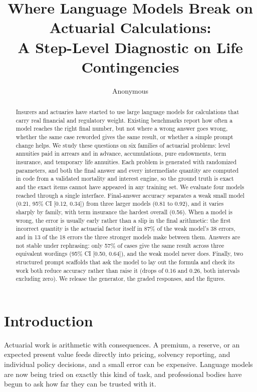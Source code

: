 \documentclass{article}
\title{Where Language Models Break on Actuarial Calculations:\\A Step-Level Diagnostic on Life Contingencies}
\author{Anonymous}
\begin{document}
\raggedbottom
\maketitle

\begin{abstract}
Insurers and actuaries have started to use large language models for calculations that carry real financial and regulatory weight. Existing benchmarks report how often a model reaches the right final number, but not where a wrong answer goes wrong, whether the same case reworded gives the same result, or whether a simple prompt change helps. We study these questions on six families of actuarial problems: level annuities paid in arrears and in advance, accumulations, pure endowments, term insurance, and temporary life annuities. Each problem is generated with randomized parameters, and both the final answer and every intermediate quantity are computed in code from a validated mortality and interest engine, so the ground truth is exact and the exact items cannot have appeared in any training set. We evaluate four models reached through a single interface. Final-answer accuracy separates a weak small model (0.21, 95\% CI [0.12, 0.34]) from three larger models (0.81 to 0.92), and it varies sharply by family, with term insurance the hardest overall (0.56). When a model is wrong, the error is usually early rather than a slip in the final arithmetic: the first incorrect quantity is the actuarial factor itself in 87\% of the weak model's 38 errors, and in 13 of the 18 errors the three stronger models make between them. Answers are not stable under rephrasing: only 57\% of cases give the same result across three equivalent wordings (95\% CI [0.50, 0.64]), and the weak model never does. Finally, two structured prompt scaffolds that ask the model to lay out the formula and check its work both reduce accuracy rather than raise it (drops of 0.16 and 0.26, both intervals excluding zero). We release the generator, the graded responses, and the figures.
\end{abstract}

\section{Introduction}
Actuarial work is arithmetic with consequences. A premium, a reserve, or an expected present value feeds directly into pricing, solvency reporting, and individual policy decisions, and a small error can be expensive. Language models are now being tried on exactly this kind of task, and professional bodies have begun to ask how far they can be trusted with it.
\end{document}
